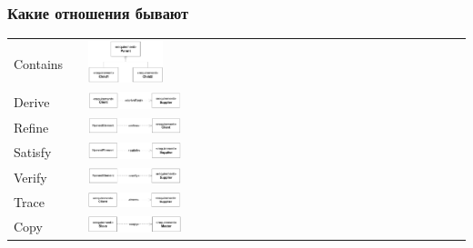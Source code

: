 \documentclass[xetex,mathserif,serif]{beamer}
\begin{document}
	\begin{frame}
		\frametitle{Какие отношения бывают}
		\begin{small}
			\begin{tabu} {X[0.9 r m] X[0.2 l p] X[1 l p]}
				Contains   & & \includegraphics[width=0.2\textwidth]{sysMlContains.png} \\
				Derive     & & \includegraphics[width=0.25\textwidth]{sysMlDerive.png}  \\
				Refine     & & \includegraphics[width=0.25\textwidth]{sysMlRefine.png}  \\
				Satisfy    & & \includegraphics[width=0.25\textwidth]{sysMlSatisfy.png} \\
				Verify     & & \includegraphics[width=0.25\textwidth]{sysMlVerify.png}  \\
				Trace      & & \includegraphics[width=0.25\textwidth]{sysMlTrace.png}   \\
				Copy       & & \includegraphics[width=0.25\textwidth]{sysMlCopy.png}    \\
			\end{tabu}
		\end{small}
	\end{frame}
\end{document}
